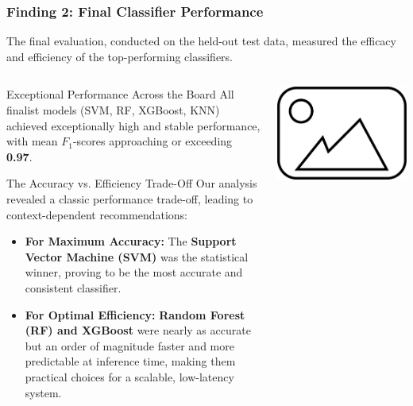 \documentclass[aspectratio=169,10pt]{beamer}
\begin{document}
\begin{frame}
    \frametitle{Finding 2: Final Classifier Performance}
    \fontsize{9}{9}\selectfont
    
    The final evaluation, conducted on the held-out test data, measured the efficacy and efficiency of the top-performing classifiers.
    
    \begin{columns}[T]
        \begin{column}{0.5\textwidth}
            \begin{block}{Exceptional Performance Across the Board}
                All finalist models (SVM, RF, XGBoost, KNN) achieved exceptionally high and stable performance, with mean \(F_1\)-scores approaching or exceeding \textbf{0.97}.
            \end{block}

            \begin{alertblock}{The Accuracy vs. Efficiency Trade-Off}
                Our analysis revealed a classic performance trade-off, leading to context-dependent recommendations:
                \begin{itemize}
                    \item \textbf{For Maximum Accuracy:} The \textbf{Support Vector Machine (SVM)} was the statistical winner, proving to be the most accurate and consistent classifier.
                    
                    \item \textbf{For Optimal Efficiency:} \textbf{Random Forest (RF) and XGBoost} were nearly as accurate but an order of magnitude faster and more predictable at inference time, making them practical choices for a scalable, low-latency system.
                \end{itemize}
            \end{alertblock}
        \end{column}
        
        \begin{column}{0.45\textwidth}
            
            \centering
            \includegraphics[width=\textwidth]{placeholder.png} %
            

\end{column}
\end{columns}
\end{frame}
\end{document}
